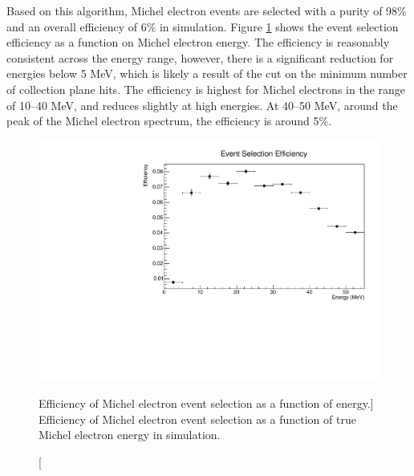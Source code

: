 Based on this algorithm, Michel electron events are selected with a
purity of 98\% and an overall efficiency of 6\% in \protodune{} simulation. 
Figure \ref{fig:ev_sel_eff} shows the event selection efficiency as a 
function on Michel electron energy. The efficiency is reasonably consistent
across the energy range, however, there is a significant reduction for energies
below 5 MeV, which is likely a result of the cut on the minimum number of
collection plane hits. The efficiency is highest for Michel electrons in the 
range of 10--40 MeV, and reduces slightly at high energies. At 40--50 MeV, 
around the peak of the Michel electron spectrum, the efficiency is around 5\%.
\begin{figure}
	\centering
	\includegraphics[width=\textwidth, height=0.68\textwidth]{figures/eff_v_energy.pdf}
	\caption
	[Efficiency of Michel electron event selection as a function of energy.]
	{Efficiency of Michel electron event selection as a function of true Michel
	electron energy in \protodune{} simulation.}
	\label{fig:ev_sel_eff}
\end{figure}

